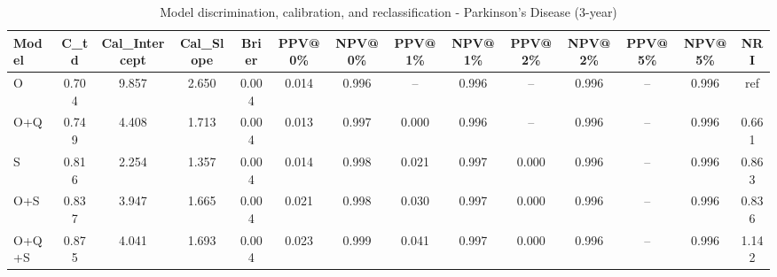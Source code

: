 \begin{table}[htbp]
\centering
\small
\caption{Model discrimination, calibration, and reclassification - Parkinson's Disease (3-year)}
\label{tab:perf_pd_3y}
\begin{tabular}{lccccccccccccc}
\toprule
Model & C\_td & Cal\_Intercept & Cal\_Slope & Brier & PPV@0\% & NPV@0\% & PPV@1\% & NPV@1\% & PPV@2\% & NPV@2\% & PPV@5\% & NPV@5\% & NRI \\
\midrule
O & 0.704 & 9.857 & 2.650 & 0.004 & 0.014 & 0.996 & -- & 0.996 & -- & 0.996 & -- & 0.996 & ref \\
O+Q & 0.749 & 4.408 & 1.713 & 0.004 & 0.013 & 0.997 & 0.000 & 0.996 & -- & 0.996 & -- & 0.996 & 0.661 \\
S & 0.816 & 2.254 & 1.357 & 0.004 & 0.014 & 0.998 & 0.021 & 0.997 & 0.000 & 0.996 & -- & 0.996 & 0.863 \\
O+S & 0.837 & 3.947 & 1.665 & 0.004 & 0.021 & 0.998 & 0.030 & 0.997 & 0.000 & 0.996 & -- & 0.996 & 0.836 \\
O+Q+S & 0.875 & 4.041 & 1.693 & 0.004 & 0.023 & 0.999 & 0.041 & 0.997 & 0.000 & 0.996 & -- & 0.996 & 1.142 \\
\bottomrule
\end{tabular}
\end{table}